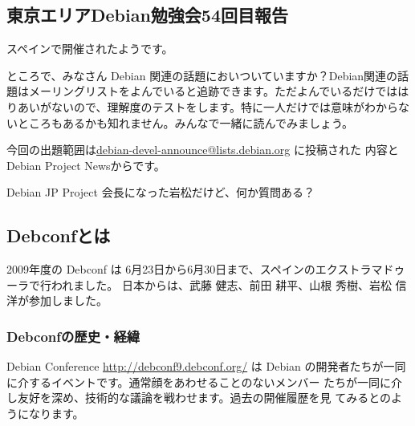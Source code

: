 \documentclass[mingoth,a4paper]{jsarticle}
\begin{document}
\subsection{東京エリアDebian勉強会54回目報告}

スペインで開催されたようです。


ところで、みなさん Debian 関連の話題においついていますか？Debian関連の話
題はメーリングリストをよんでいると追跡できます。ただよんでいるだけではは
りあいがないので、理解度のテストをします。特に一人だけでは意味がわからな
いところもあるかも知れません。みんなで一緒に読んでみましょう。

今回の出題範囲は\url{debian-devel-announce@lists.debian.org} に投稿された
内容とDebian Project Newsからです。

% 



Debian JP Project 会長になった岩松だけど、何か質問ある？

\label{sec:debconfreportsummary}

\subsection{Debconfとは}

2009年度の Debconf は 6月23日から6月30日まで、スペインのエクストラマドゥーラで行われました。
日本からは、武藤 健志、前田 耕平、山根 秀樹、岩松 信洋が参加しました。

\subsubsection{Debconfの歴史・経緯}

Debian Conference \url{http://debconf9.debconf.org/} は Debian 
の開発者たちが一同に介するイベントです。通常顔をあわせることのないメンバー
たちが一同に介し友好を深め、技術的な議論を戦わせます。過去の開催履歴を見
てみるとのようになります。
\end{document}
